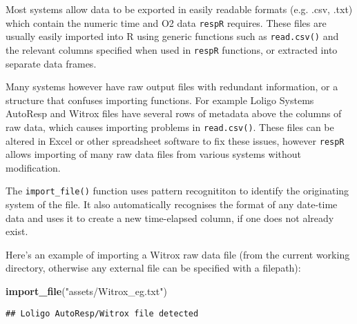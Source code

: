 \documentclass[]{book}
\newenvironment{Shaded}{\begin{snugshade}}{\end{snugshade}}
\newcommand{\KeywordTok}[1]{\textcolor[rgb]{0.13,0.29,0.53}{\textbf{#1}}}
\newcommand{\StringTok}[1]{\textcolor[rgb]{0.31,0.60,0.02}{#1}}
\newcommand{\NormalTok}[1]{#1}
\begin{document}
Most systems allow data to be exported in easily readable formats (e.g.
.csv, .txt) which contain the numeric time and O2 data \texttt{respR}
requires. These files are usually easily imported into R using generic
functions such as \texttt{read.csv()} and the relevant columns specified
when used in \texttt{respR} functions, or extracted into separate data
frames.

Many systems however have raw output files with redundant information,
or a structure that confuses importing functions. For example Loligo
Systems AutoResp and Witrox files have several rows of metadata above
the columns of raw data, which causes importing problems in
\texttt{read.csv()}. These files can be altered in Excel or other
spreadsheet software to fix these issues, however \texttt{respR} allows
importing of many raw data files from various systems without
modification.

The \texttt{import\_file()} function uses pattern recognititon to
identify the originating system of the file. It also automatically
recognises the format of any date-time data and uses it to create a new
time-elapsed column, if one does not already exist.

Here's an example of importing a Witrox raw data file (from the current
working directory, otherwise any external file can be specified with a
filepath):

\begin{Shaded}
\begin{Highlighting}[]
\KeywordTok{import_file}\NormalTok{(}\StringTok{"assets/Witrox_eg.txt"}\NormalTok{)}
\end{Highlighting}
\end{Shaded}

\begin{verbatim}
## Loligo AutoResp/Witrox file detected
\end{verbatim}
\end{document}
